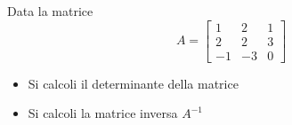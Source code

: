 Data la matrice
\[
A=\left[
\begin{array}{ccc}
1 & 2 & 1 \\
2 & 2 & 3\\
-1 & -3 & 0
\end{array}\right]
\]

\begin{itemize}
\item Si calcoli il determinante della matrice
\item Si calcoli la matrice inversa $A^{-1}$

\end{itemize}
